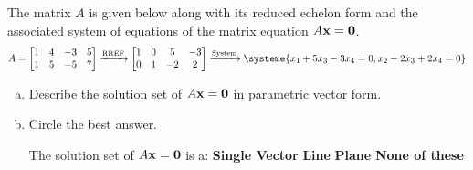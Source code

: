 \begin{exercise} %
	The matrix $A$ is given below along with its reduced echelon form and the associated system of equations of the matrix equation $A\boldsymbol{\mathbf{x}}=\boldsymbol{\mathbf{0}}$.
	$$A=\begin{bmatrix}1&4&-3&5\\1&5&-5&7\end{bmatrix}\xrightarrow{\text{RREF}}
	\begin{bmatrix}1&0&5&-3\\0&1&-2&2\end{bmatrix}\xrightarrow{\text{System}}
	\systeme{x_1 + 5x_3 - 3x_4 = 0, x_2 - 2x_3 + 2x_4 = 0} $$
	\begin{enumerate}[(a)]
		\item Describe the solution set of $A\boldsymbol{\mathbf{x}}=\boldsymbol{\mathbf{0}}$ in parametric vector form.
		\vfill
		\item Circle the best answer. \par
		The solution set of $A\boldsymbol{\mathbf{x}}=\boldsymbol{\mathbf{0}}$ is a: \quad \textbf{Single Vector} \qquad \textbf{Line} \qquad \textbf{Plane} \qquad \textbf{None of these}
	\end{enumerate}
\end{exercise}


\newpage



